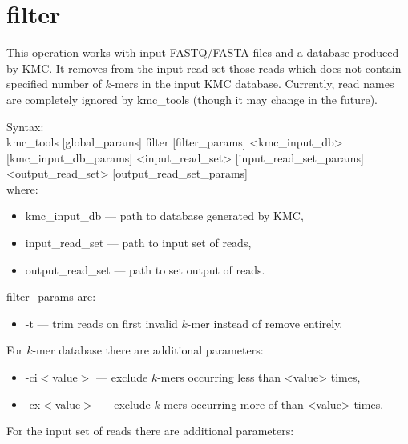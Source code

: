 \clearpage
\section{filter}
\label{sec:filter_operation}

This operation works with input FASTQ/FASTA files and a database produced by \textsf{KMC}.
It removes from the input read set those reads which does not contain specified number of $k$-mers in the input \textsf{KMC} database.
Currently, read names are completely ignored by kmc\_tools (though it may change in the future).

Syntax: \\
kmc\_tools [global\_params] filter [filter\_params] <kmc\_input\_db> [kmc\_input\_db\_params] <input\_read\_set> [input\_read\_set\_params]  <output\_read\_set> [output\_read\_set\_params] \\

where:

\begin{itemize}
	\item \textsf{kmc\_input\_db} --- path to database generated by \textsf{KMC},
	\item \textsf{input\_read\_set} --- path to input set of reads,
	\item \textsf{output\_read\_set} --- path to set output of reads.
\end{itemize}

filter\_params are:
\begin{itemize}
	\item \textsf{-t} --- trim reads on first invalid $k$-mer instead of remove entirely.
\end{itemize}

For $k$-mer database there are additional parameters:

\begin{itemize}
	\item \textsf{-ci$<$value$>$} --- exclude $k$-mers occurring less than <value> times,
	\item \textsf{-cx$<$value$>$} --- exclude $k$-mers occurring more of than <value> times.
\end{itemize}

For the input set of reads there are additional parameters:

